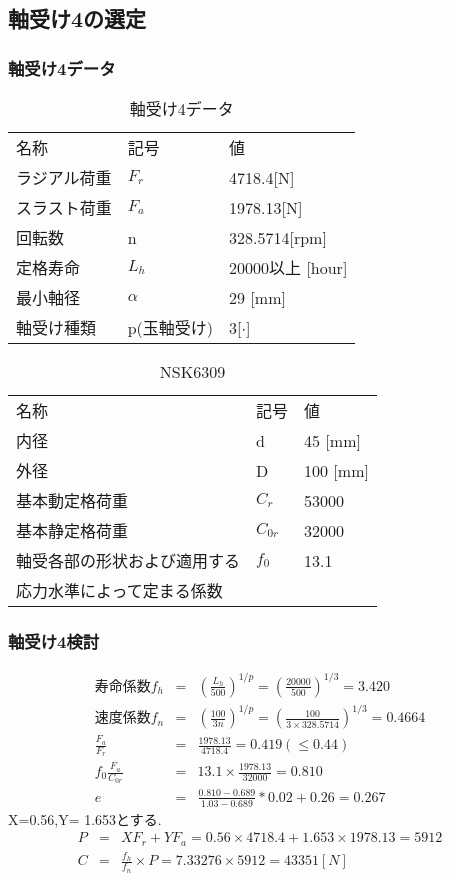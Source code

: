 \newpage
\subsection{軸受け4の選定}
\subsubsection{軸受け4データ}
\begin{table}[htb]
\begin{center}
  \caption{軸受け4データ}
  \begin{tabular}{lll} \hline
名称&記号&値\\
ラジアル荷重&$F_r$&4718.4[N]\\
スラスト荷重&$F_a$&1978.13[N]\\
回転数&n&328.5714[rpm]\\
定格寿命&$L_h$&20000以上 [hour]\\
最小軸径&$\alpha$&29 [mm]\\
軸受け種類&p(玉軸受け)&3[$\cdot$]\\
\hline
  \end{tabular}
\end{center}
\end{table}

\begin{table}[htb]
\begin{center}
  \caption{NSK6309}
  \begin{tabular}{lll} \hline
名称&記号&値\\
内径& d &45 [mm]\\
外径& D &100 [mm]\\
基本動定格荷重&$C_{r}$&53000\\
基本静定格荷重&$C_{0r}$&32000\\
軸受各部の形状および適用する&$f_0$&13.1\\
応力水準によって定まる係数&&\\
\hline
  \end{tabular}
\end{center}
\end{table}

\subsubsection{軸受け4検討}
\begin{eqnarray}
寿命係数f_h &=& \left( \frac{L_h}{500} \right)^{1/p} = \left( \frac{20000}{500} \right)^{1/3} = 3.420\\
速度係数f_n &=& \left( \frac{100}{3n} \right)^{1/p} = \left( \frac{100}{3 \times 328.5714} \right)^{1/3} = 0.4664\\
\frac{F_a}{F_r} &=& \frac{1978.13}{4718.4} = 0.419(\leq 0.44)\\
f_0\frac{F_a}{C_{0r}}&=& 13.1 \times \frac{1978.13}{32000} = 0.810\\
e&=&\frac{0.810-0.689}{1.03-0.689}*0.02 + 0.26 = 0.267
\end{eqnarray}
X=0.56,Y= 1.653とする.
\begin{eqnarray}
P &=& XF_r+YF_a = 0.56 \times 4718.4 + 1.653 \times 1978.13 = 5912\\
C &=& \frac{f_h}{f_n} \times P = 7.33276 \times 5912 = 43351[N]
\end{eqnarray}

